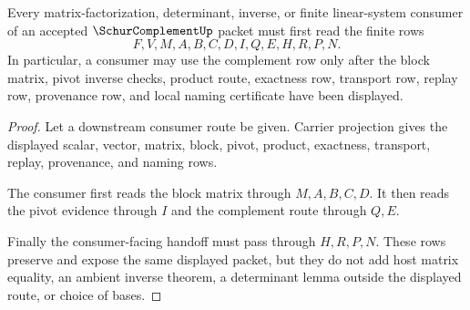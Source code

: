 \begin{theorem}
\label{thm:schur-complement-block-matrix-handoff}
Every matrix-factorization, determinant, inverse, or finite linear-system consumer of an accepted $\SchurComplementUp$ packet must first read the finite rows
$$
F,V,M,A,B,C,D,I,Q,E,H,R,P,N.
$$
In particular, a consumer may use the complement row only after the block matrix, pivot inverse checks, product route, exactness row, transport row, replay row, provenance row, and local naming certificate have been displayed.
\end{theorem}
\begin{proof}
Let a downstream consumer route be given. Carrier projection gives the displayed scalar, vector, matrix, block, pivot, product, exactness, transport, replay, provenance, and naming rows.

The consumer first reads the block matrix through $M,A,B,C,D$. It then reads the pivot evidence through $I$ and the complement route through $Q,E$.

Finally the consumer-facing handoff must pass through $H,R,P,N$. These rows preserve and expose the same displayed packet, but they do not add host matrix equality, an ambient inverse theorem, a determinant lemma outside the displayed route, or choice of bases.
\end{proof}


\begin{closurestatus}{\SchurComplementUp}
  \theoryclosure{\seedClosure}
  \formalstatus{\unformalizedV}
\end{closurestatus}
